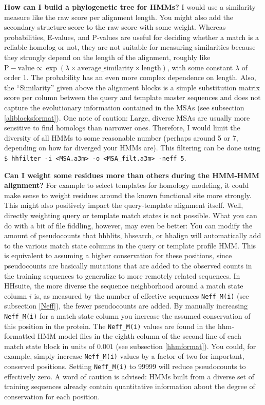 \documentclass[11pt,a4paper]{article}
\begin{document}
{\bf How can I build a phylogenetic tree for HMMs?}
I would use a similarity measure like the raw score per alignment length. You might also add the secondary structure score to the raw score with some weight. Whereas probabilities, E-values, and P-values are useful for deciding whether a match is a reliable homolog or not, they are not suitable for measuring similarities because they strongly depend on the length of the alignment, roughly like $\mathrm{P-value} \propto \exp(\lambda \times \mathrm{average\_similarity} \times \mathrm{length})$, with some constant $\lambda$ of order 1. The probability has an even more complex dependence on length. Also, the ``Similarity'' given above the alignment blocks is a simple substitution matrix score per column between the query and template master sequences and does not capture the evolutionary information contained in the MSAs (see subsection \ref{aliblocksformat}). One note of caution: Large, diverse MSAs are usually more sensitive to find homologs than narrower ones. Therefore, I would limit the diversity of all HMMs to some reasonable number (perhaps around 5 or 7, depending on how far diverged your HMMs are). This filtering can be done using \verb`$ hhfilter -i <MSA.a3m> -o <MSA_filt.a3m> -neff 5`. 

{\bf Can I weight some residues more than others during the HMM-HMM alignment?} For example to select templates for homology modeling, it could make sense to weight residues around the known functional site more strongly. This might also positively impact the query-template alignment itself. Well, directly weighting query or template match states is not possible. What you can do with a bit of file fiddling, however, may even be better: You can modify the amount of pseudocounts that hhblits, hhsearch, or hhalign will automatically add to the various match state columns in the query or template profile HMM. This is equivalent to assuming a higher conservation for these positions, since pseudocounts are basically mutations that are added to the observed counts in the training sequences to generalize to more remotely related sequences. In HHsuite, the more diverse the sequence neighborhood around a match state column $i$ is, as measured by the number of effective sequences \verb`Neff_M(i)` (see subsection \ref{Neff}), the fewer pseudocounts are added. By manually increasing \verb`Neff_M(i)` for a match state column you increase the assumed conservation of this position in the protein. The \verb`Neff_M(i)` values are found in the hhm-formatted HMM model files in the eighth column of the second line of each match state block in units of $0.001$ (see subsection \ref{hhmformat}). You could, for example, simply increase \verb`Neff_M(i)` values by a factor of two for important, conserved positions. Setting \verb`Neff_M(i)` to 99999 will reduce pseudocounts to effectively zero. A word of caution is advised: HMMs built from a diverse set of training sequences already contain quantitative information about the degree of conservation for each position.
\end{document}
